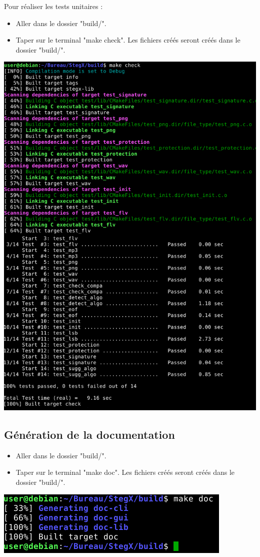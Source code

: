\documentclass[11pt]{article}
\begin{document}
Pour réaliser les tests unitaires : 
\begin{itemize}
\item Aller dans le dossier "build/".
\item Taper sur le terminal "make check". Les fichiers créés seront créés 
dans le dossier "build/". 
\end{itemize}
\vspace{0.5cm}
\hspace{3cm}
\includegraphics[scale=0.45]{pictures/check.png}
\vspace{1cm}

\subsection{Génération de la documentation}
\begin{itemize}
\item Aller dans le dossier "build/".
\item Taper sur le terminal "make doc". Les fichiers créés seront créés 
dans le dossier "build/". 
\end{itemize}
\vspace{0.5cm}
\hspace{3cm}
\includegraphics[scale=0.7]{pictures/doc.png}
\end{document}
